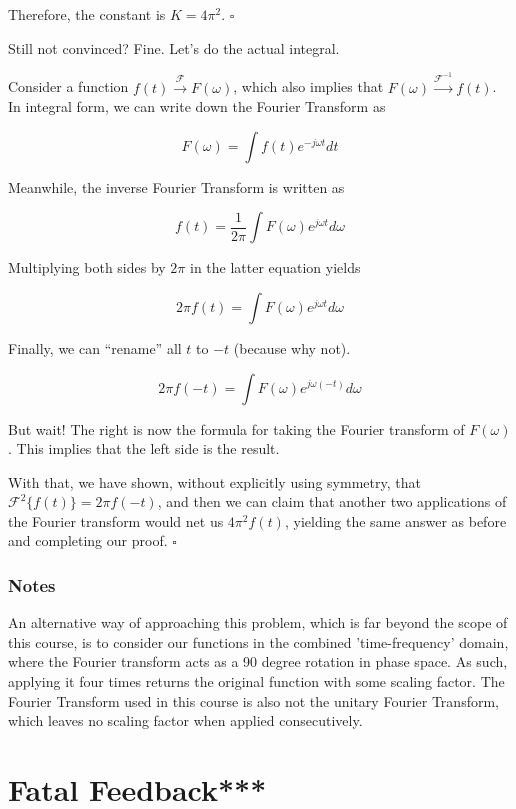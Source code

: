 \documentclass{article}
\begin{document}
Therefore, the constant is $K = 4\pi^2$. $\square$

\vspace{1cm} Still not convinced? Fine. Let's do the actual integral.

\vspace{3mm}

Consider a function $f(t) \xrightarrow{\mathcal{F}} F(\omega)$, which also implies that $F(\omega) \xrightarrow{\mathcal{F}^{-1}} f(t)$. In integral form, we can write down the Fourier Transform as

$$F(\omega) = \int f(t) e^{-j\omega t}dt$$

Meanwhile, the inverse Fourier Transform is written as

$$f(t) = \frac{1}{2\pi} \int F(\omega) e^{j\omega t}d\omega$$

Multiplying both sides by $2\pi$ in the latter equation yields

$$2\pi f(t) = \int F(\omega) e^{j\omega t}d\omega$$

Finally, we can ``rename'' all $t$ to  $-t$ (because why not).

$$2\pi f(-t) = \int F(\omega) e^{j\omega (-t)}d\omega$$

But wait! The right is now the formula for taking the Fourier transform of $F(\omega)$. This implies that the left side is the result.

With that, we have shown, without explicitly using symmetry, that $\mathcal{F}^2\{f(t)\} = 2\pi f(-t)$, and then we can claim that another two applications of the Fourier transform would net us $4\pi^2 f(t)$, yielding the same answer as before and completing our proof. $\square$

\subsubsection{Notes} 
An alternative way of approaching this problem, which is far beyond the scope of this course, is to consider our functions in the combined 'time-frequency' domain, where the Fourier transform acts as a 90 degree rotation in phase space. As such, applying it four times returns the original function with some scaling factor. The Fourier Transform used in this course is also not the unitary Fourier Transform, which leaves no scaling factor when applied consecutively.

\newpage


\section{Fatal Feedback***}
\end{document}
